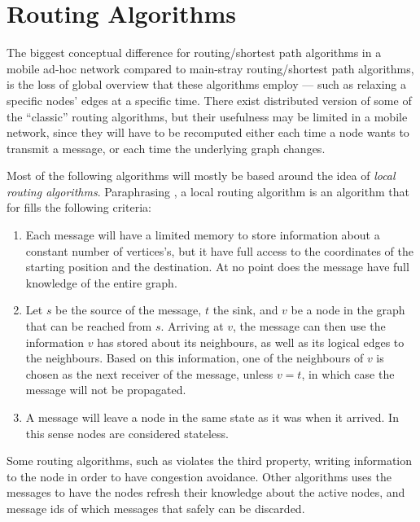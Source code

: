 \documentclass[letter, 12pt, english, draft]{article}
\begin{document}
\section{Routing Algorithms}

The biggest conceptual difference for routing/shortest path algorithms in a mobile ad-hoc network compared to main-stray routing/shortest path algorithms, is the loss of global overview that these algorithms employ --- such as relaxing a specific nodes' edges at a specific time. There exist distributed version of some of the ``classic'' routing algorithms, but their usefulness may be limited in a mobile network, since they will have to be recomputed either each time a node wants to transmit a message, or each time the underlying graph changes.

Most of the following algorithms will mostly be based around the idea of \emph{local routing algorithms}. Paraphrasing \cite{compass}, a local routing algorithm is an algorithm that for fills the following criteria:
\begin{enumerate}
\item Each message will have a limited memory to store information about a constant number of vertices's, but it have full access to the coordinates of the starting position and the destination. At no point does the message have full knowledge of the entire graph.
\item Let $s$ be the source of the message, $t$ the sink, and $v$ be a node in the graph that can be reached from $s$. Arriving at $v$, the message can then use the information $v$ has stored about its neighbours, as well as its logical edges to the neighbours. Based on this information, one of the neighbours of $v$ is chosen as the next receiver of the message, unless $v = t$, in which case the message will not be propagated.
\item A message will leave a node in the same state as it was when it arrived. In this sense nodes are considered stateless.\end{enumerate}

Some routing algorithms, such as \cite{speed} violates the third property, writing information to the node in order to have congestion avoidance. Other algorithms uses the messages to have the nodes refresh their knowledge about the active nodes, and message ids of which messages that safely can be discarded. 
\end{document}
